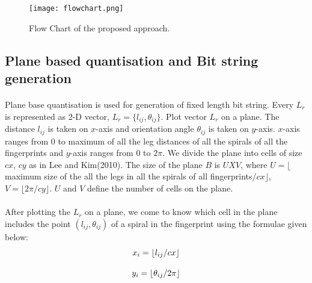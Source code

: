 \documentclass[14pt, oneside]{article}   	%
\begin{document}
\begin{figure}[htbp]
\begin{center}
\texttt{[image: flowchart.png]}
\caption{Flow Chart of the proposed approach.}
\end{center}
\end{figure} 

\subsection{Plane based quantisation and Bit string generation}
\paragraph{}
Plane base quantisation is used for generation of fixed length bit string. Every $L_r$ is represented as 2-D vector, $L_r=\{ l_{ij},\theta_{ij}\}$. Plot vector $L_r$ on a plane. The distance $l_{ij}$ is taken on $x$-axis and orientation angle $\theta_{ij}$ is taken on $y$-axis. $x$-axis ranges from $0$ to maximum of all the leg distances of all the spirals of all the fingerprints and $y$-axis ranges from $0$ to $2\pi$. We divide the plane into cells of size $cx$, $cy$ as in Lee and Kim(2010). The size of the plane $B$ is $U X V$, where $U=\lfloor$maximum size of the all the legs in all the spirals of all fingerprints$/cx\rfloor$, $V=\lfloor2\pi/cy\rfloor$. 
$U$ and $V$ define the number of cells on the plane. 


\paragraph{}
After plotting the $L_r$ on a plane, we come to know which cell in the plane includes the point $( l_{ij},\theta_{ij})$ of a spiral in the fingerprint using the formulae given below:\\
\[ 
x_i= \lfloor l_{ij}/cx\rfloor \\
\]

\[
y_i= \lfloor \theta_{ij}/2\pi \rfloor \\
\]
\end{document}

